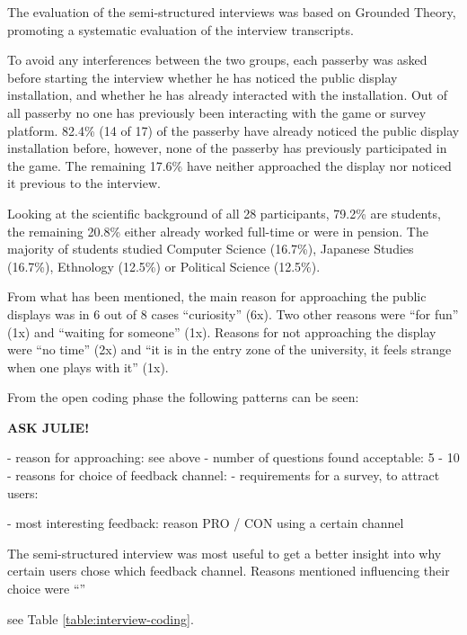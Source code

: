 	The evaluation of the semi-structured interviews was based on Grounded Theory, promoting a systematic evaluation of the interview transcripts.

	To avoid any interferences between the two groups, each passerby was asked before starting the interview whether he has noticed the public display installation, and whether he has already interacted with the installation. Out of all passerby no one has previously been interacting with the game or survey platform. 82.4\% (14 of 17) of the passerby have already noticed the public display installation before, however, none of the passerby has previously participated in the game. The remaining 17.6\% have neither approached the display nor noticed it previous to the interview. 

	Looking at the scientific background of all 28 participants, 79.2\% are students, the remaining 20.8\% either already worked full-time or were in pension. The majority of students studied Computer Science (16.7\%), Japanese Studies (16.7\%), Ethnology (12.5\%) or Political Science (12.5\%).

	From what has been mentioned, the main reason for approaching the public displays was in 6 out of 8 cases ``curiosity'' (6x). Two other reasons were ``for fun'' (1x) and ``waiting for someone'' (1x). Reasons for not approaching the display were ``no time'' (2x) and ``it is in the entry zone of the university, it feels strange when one plays with it'' (1x).

	From the open coding phase the following patterns can be seen: 

		\textbf{ASK JULIE!}

		- reason for approaching: see above
		- number of questions found acceptable: 5 - 10
		- reasons for choice of feedback channel: 
		- requirements for a survey, to attract users: 

		- most interesting feedback: reason PRO / CON using a certain channel

	The semi-structured interview was most useful to get a better insight into why certain users chose which feedback channel. Reasons mentioned influencing their choice were ``''
	
	see Table \ref{table:interview-coding}.





